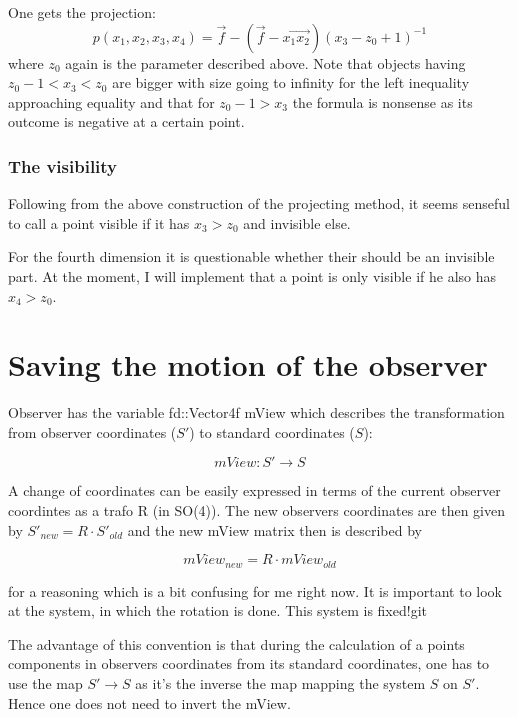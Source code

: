 \documentclass[titlepage]{scrartcl}
\begin{document}
One gets the projection:
\begin{equation}
p(x_1, x_2, x_3, x_4) = \vec{f} - (\vec{f} - \vec{x_1 x_2})(x_3 - z_0 + 1)^{-1}
\end{equation}
where $z_0$ again is the parameter described above. Note that objects having $z_0 - 1 < x_3 < z_0$ are bigger with size going to infinity for the left inequality approaching equality and that for $z_0 - 1 > x_3$ the formula is nonsense as its outcome is negative at a certain point. 

\subsubsection{The visibility}

Following from the above construction of the projecting method, it seems senseful to call a point visible if it has $x_3 > z_0$ and invisible else. 

For the fourth dimension it is questionable whether their should be an invisible part. At the moment, I will implement that a point is only visible if he also has $x_4 > z_0$. 

\section{Saving the motion of the observer}

Observer has the variable fd::Vector4f mView which describes the transformation from observer coordinates ($S'$) to standard coordinates ($S$):

\begin{equation}
mView: S' \to S
\end{equation}

A change of coordinates can be easily expressed in terms of the current observer coordintes as a trafo R (in SO(4)). The new observers coordinates are then given by $S'_{new} = R \cdot S'_{old}$ and the new mView matrix then is described by 

\begin{equation}
mView_{new} = R \cdot mView_{old} 
\end{equation}

for a reasoning which is a bit confusing for me right now. It is important to look at the system, in which the rotation is done. This system is fixed!git 

The advantage of this convention is that during the calculation of a points components in observers coordinates from its standard coordinates, one has to use the map $S' \to S$ as it's the inverse the map mapping the system $S$ on $S'$. Hence one does not need to invert the mView.
\end{document}
